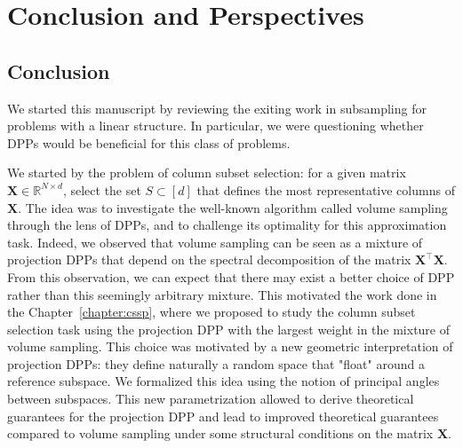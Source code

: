 \documentclass[twoside,11pt]{book}
\numberwithin{theorem}{chapter}
\numberwithin{definition}{chapter}
\numberwithin{proposition}{chapter}
\numberwithin{corollary}{chapter}
\numberwithin{example}{chapter}
\numberwithin{lemma}{chapter}
\numberwithin{assumption}{chapter}
\numberwithin{equation}{chapter}
\numberwithin{figure}{chapter}
\DeclareMathOperator{\Tran}{\intercal}
\begin{document}


\chapter{Conclusion and Perspectives}\label{chap:conclusion}

\section{Conclusion}


We started this manuscript by reviewing the exiting work in subsampling for problems with a linear structure. In particular, we were questioning whether DPPs would be beneficial for this class of problems. 

We started by the problem of column subset selection: for a given matrix $\bm{X} \in \mathbb{R}^{N \times d}$, select the set $S \subset [d]$ that defines the most representative columns of $\bm{X}$. 
The idea was to investigate the well-known algorithm called volume sampling through the lens of DPPs, and to challenge its optimality for this approximation task. Indeed,  we observed that volume sampling can be seen as a mixture of projection DPPs that depend on the spectral decomposition of the matrix $\bm{X}^{\Tran}\bm{X}$. From this observation, we can expect that there may exist a better choice of DPP rather than this seemingly arbitrary mixture. This motivated the work done in the Chapter~\ref{chapter:cssp}, where we proposed to study the column subset selection task using the projection DPP with the largest weight in the mixture of volume sampling. This choice was motivated by a new geometric interpretation of projection DPPs: they define naturally a random space that "float" around a reference subspace. We formalized this idea  using the notion of principal angles between subspaces. This new parametrization allowed to derive theoretical guarantees for the  projection DPP and lead to improved theoretical guarantees compared to  volume sampling under some structural conditions on the matrix $\bm{X}$.
\end{document}
